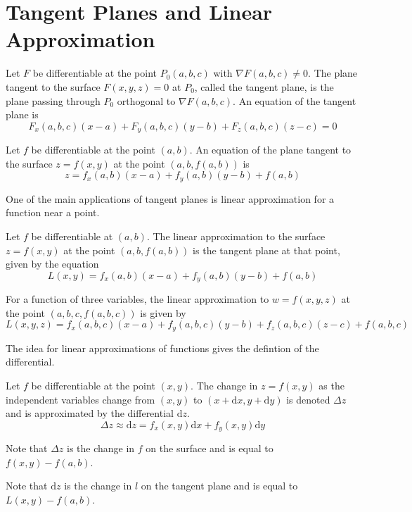 \documentclass[../calc3.tex]{subfiles}
\begin{document}
\section{Tangent Planes and Linear Approximation}
\begin{definition}
    Let $F$ be differentiable at the point $P_0(a,b,c)$ with $\nabla F(a,b,c)\neq 0$. The plane 
    tangent to the surface $F(x,y,z)=0$ at $P_0$, called the tangent plane, is the plane 
    passing through $P_0$ orthogonal to $\nabla F(a,b,c)$. An equation of the tangent plane is
    \[F_x(a,b,c)(x-a)+F_y(a,b,c)(y-b)+F_z(a,b,c)(z-c)=0\]
\end{definition}

\begin{definition}
    Let $f$ be differentiable at the point $(a,b)$. An equation of the plane tangent to the 
    surface $z=f(x,y)$ at the point $(a,b,f(a,b))$ is 
    \[z=f_x(a,b)(x-a)+f_y(a,b)(y-b)+f(a,b)\] 
\end{definition}

One of the main applications of tangent planes is linear approximation for a function near a point.

\begin{definition}
    Let $f$ be differentiable at $(a,b)$. The linear approximation to the surface
    $z=f(x,y)$ at the point $(a,b,f(a,b))$ is the tangent plane at that point, given by the equation 
    \[L(x,y)=f_x(a,b)(x-a)+f_y(a,b)(y-b)+f(a,b)\]

    For a function of three variables, the linear approximation to $w=f(x,y,z)$ at the 
    point $(a,b,c,f(a,b,c))$ is given by 
    \[L(x,y,z)=f_x(a,b,c)(x-a)+f_y(a,b,c)(y-b)+f_z(a,b,c)(z-c)+f(a,b,c)\]
\end{definition}

The idea for linear approximations of functions gives the defintion of the differential. 
\begin{definition}
    Let $f$ be differentiable at the point $(x,y)$. The change in $z=f(x,y)$ as the 
    independent variables change from $(x,y)$ to $(x+\mathrm{d}x, y+\mathrm{d}y)$ is denoted $\Delta z$ and is 
    approximated by the differential $\mathrm{d}z$.
    \[ \Delta z \approx \mathrm{d}z = f_x(x,y)\mathrm{d}x+f_y(x,y)\mathrm{d}y\] 
\end{definition}

Note that $\Delta z$ is the change in $f$ on the surface and is equal to $f(x,y)-f(a,b)$.

Note that $\mathrm{d}z$ is the change in $l$ on the tangent plane and is equal to $L(x,y)-f(a,b)$.
\end{document}
